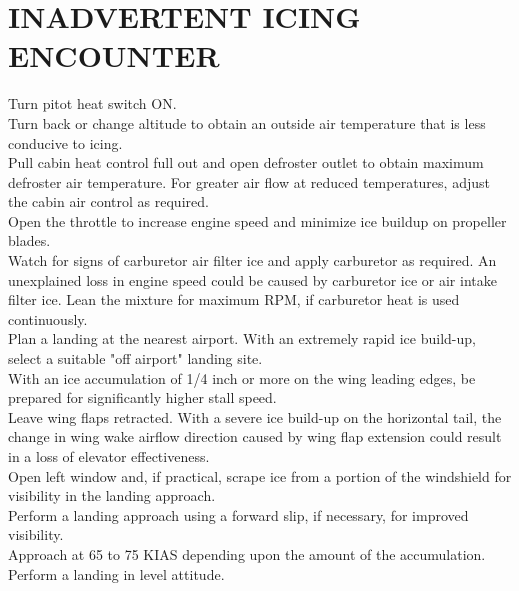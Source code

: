 \documentclass{article}
\begin{document}
\section*{INADVERTENT ICING ENCOUNTER}
\begin{flushleft}
Turn pitot heat switch ON.\\
Turn back or change altitude to obtain an outside air temperature that is less conducive to icing.\\
Pull cabin heat control full out and open defroster outlet to obtain maximum defroster air temperature. For greater air flow at reduced temperatures, adjust the cabin air control as required.\\
Open the throttle to increase engine speed and minimize ice buildup on propeller blades.\\
Watch for signs of carburetor air filter ice and apply carburetor as required. An unexplained loss in engine speed could be caused by carburetor ice or air intake filter ice. Lean the mixture for maximum RPM, if carburetor heat is used continuously.\\
Plan a landing at the nearest airport. With an extremely rapid ice build-up, select a suitable "off airport" landing site.\\
With an ice accumulation of 1/4 inch or more on the wing leading edges, be prepared for significantly higher stall speed.\\
Leave wing flaps retracted. With a severe ice build-up on the horizontal tail, the change in wing wake airflow direction caused by wing flap extension could result in a loss of elevator effectiveness.\\
Open left window and, if practical, scrape ice from a portion of the windshield for visibility in the landing approach.\\
Perform a landing approach using a forward slip, if necessary, for improved visibility.\\
Approach at 65 to 75 KIAS depending upon the amount of the accumulation.\\
Perform a landing in level attitude.
\end{flushleft}
\end{document}
